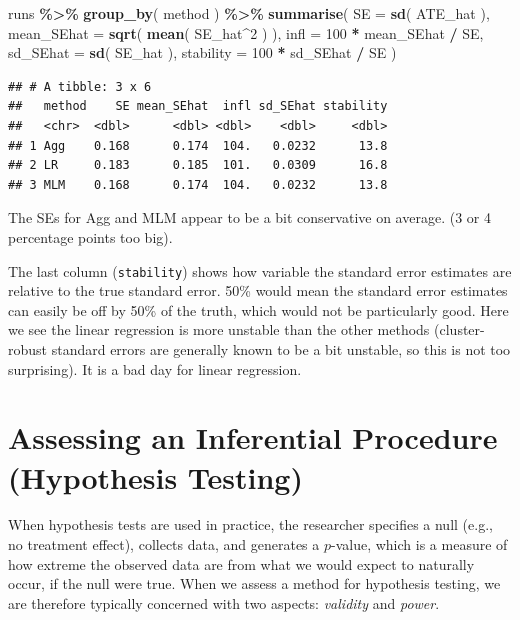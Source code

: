 \documentclass[
]{book}
\newenvironment{Shaded}{\begin{snugshade}}{\end{snugshade}}
\newcommand{\AttributeTok}[1]{\textcolor[rgb]{0.13,0.29,0.53}{#1}}
\newcommand{\DecValTok}[1]{\textcolor[rgb]{0.00,0.00,0.81}{#1}}
\newcommand{\FunctionTok}[1]{\textcolor[rgb]{0.13,0.29,0.53}{\textbf{#1}}}
\newcommand{\NormalTok}[1]{#1}
\newcommand{\SpecialCharTok}[1]{\textcolor[rgb]{0.81,0.36,0.00}{\textbf{#1}}}
\begin{document}
\begin{Shaded}
\begin{Highlighting}[]
\NormalTok{runs }\SpecialCharTok{\%\textgreater{}\%}  \FunctionTok{group\_by}\NormalTok{( method ) }\SpecialCharTok{\%\textgreater{}\%}
  \FunctionTok{summarise}\NormalTok{( }
    \AttributeTok{SE =} \FunctionTok{sd}\NormalTok{( ATE\_hat ),}
    \AttributeTok{mean\_SEhat =} \FunctionTok{sqrt}\NormalTok{( }\FunctionTok{mean}\NormalTok{( SE\_hat}\SpecialCharTok{\^{}}\DecValTok{2}\NormalTok{ ) ),}
    \AttributeTok{infl =} \DecValTok{100} \SpecialCharTok{*}\NormalTok{ mean\_SEhat }\SpecialCharTok{/}\NormalTok{ SE,}
    \AttributeTok{sd\_SEhat =} \FunctionTok{sd}\NormalTok{( SE\_hat ),}
    \AttributeTok{stability =} \DecValTok{100} \SpecialCharTok{*}\NormalTok{ sd\_SEhat }\SpecialCharTok{/}\NormalTok{ SE )}
\end{Highlighting}
\end{Shaded}

\begin{verbatim}
## # A tibble: 3 x 6
##   method    SE mean_SEhat  infl sd_SEhat stability
##   <chr>  <dbl>      <dbl> <dbl>    <dbl>     <dbl>
## 1 Agg    0.168      0.174  104.   0.0232      13.8
## 2 LR     0.183      0.185  101.   0.0309      16.8
## 3 MLM    0.168      0.174  104.   0.0232      13.8
\end{verbatim}

The SEs for Agg and MLM appear to be a bit conservative on average. (3 or 4 percentage points too big).

The last column (\texttt{stability}) shows how variable the standard error estimates are relative to the true standard error.
50\% would mean the standard error estimates can easily be off by 50\% of the truth, which would not be particularly good.
Here we see the linear regression is more unstable than the other methods (cluster-robust standard errors are generally known to be a bit unstable, so this is not too surprising).
It is a bad day for linear regression.

\section{Assessing an Inferential Procedure (Hypothesis Testing)}\label{assessing-an-inferential-procedure-hypothesis-testing}

When hypothesis tests are used in practice, the researcher specifies a null (e.g., no treatment effect), collects data, and generates a \(p\)-value, which is a measure of how extreme the observed data are from what we would expect to naturally occur, if the null were true.
When we assess a method for hypothesis testing, we are therefore typically concerned with two aspects: \emph{validity} and \emph{power}.
\end{document}
